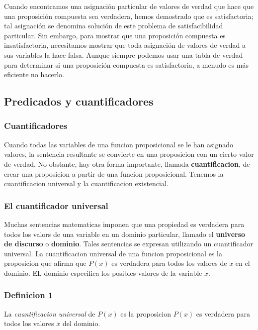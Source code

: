 \documentclass[]{article}
\begin{document}
Cuando encontramos una asignación particular de valores de verdad que hace que una proposición compuesta sea verdadera, hemos demostrado que es satisfactoria; tal asignación se denomina solución de este problema de satisfacibilidad particular. Sin embargo, para mostrar que una proposición compuesta es insatisfactoria, necesitamos mostrar que toda asignación de valores de verdad a sus variables la hace falsa. Aunque siempre podemos usar una tabla de verdad para determinar si una proposición compuesta es satisfactoria, a menudo es más eficiente no hacerlo.

\subsection{Predicados y cuantificadores}

\subsubsection*{Cuantificadores}

Cuando todas las variables de una funcion proposicional se le han asignado valores, la sentencia resultante se convierte en una proposicion con un cierto valor de verdad. No obstante, hay otra forma importante, llamada \textbf{cuantificacion}, de crear una proposicion a partir de una funcion proposicional. Tenemos la cuantificacion universal y la cuantificacion existencial.

\subsubsection*{El cuantificador universal}\label{sec:cuantificador-universal}

Muchas sentencias matematicas imponen que una propiedad es verdadera para todos los valors de una variable en un dominio particular, llamado el \textbf{universo de discurso} o \textbf{dominio}. Tales sentencias se expresan utilizando un cuantificador universal. La cuantificacion universal de una funcion proposicional es la proposicion que afirma que $P(x)$ es verdadera para todos los valores de $x$ en el dominio. EL dominio especifica los posibles valores de la variable $x$.

\subsubsection*{Definicion 1}\label{sec:def1-cuantificacion}

La \textit{cuantificacion universal} de $P(x)$ es la proposicion $P(x)$ es verdadera para todos los valores $x$ del dominio.
\end{document}
